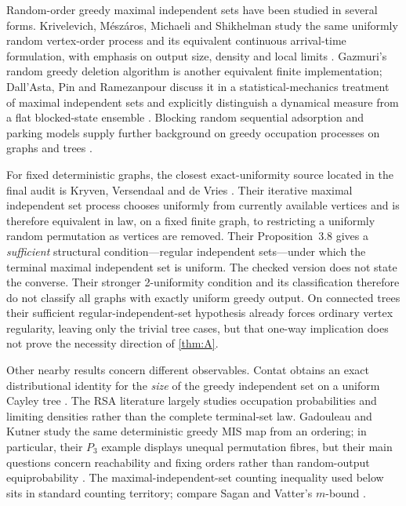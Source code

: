 \documentclass[11pt]{article}
\theoremstyle{definition}
\begin{document}
Random-order greedy maximal independent sets have been studied in several forms.  Krivelevich, M\'esz\'aros, Michaeli and Shikhelman study the same uniformly random vertex-order process and its equivalent continuous arrival-time formulation, with emphasis on output size, density and local limits \cite{KrivelevichEtAl2020}.  Gazmuri's random greedy deletion algorithm is another equivalent finite implementation; Dall'Asta, Pin and Ramezanpour discuss it in a statistical-mechanics treatment of maximal independent sets and explicitly distinguish a dynamical measure from a flat blocked-state ensemble \cite{Gazmuri1984,DallAstaEtAl2009}.  Blocking random sequential adsorption and parking models supply further background on greedy occupation processes on graphs and trees \cite{Pippenger1989,DehlingEtAl2008,Sudbury2009,PenroseSudbury2005}.

For fixed deterministic graphs, the closest exact-uniformity source located in the final audit is Kryven, Versendaal and de Vries \cite{KryvenEtAl2026}.  Their iterative maximal independent set process chooses uniformly from currently available vertices and is therefore equivalent in law, on a fixed finite graph, to restricting a uniformly random permutation as vertices are removed.  Their Proposition~3.8 gives a \emph{sufficient} structural condition---regular independent sets---under which the terminal maximal independent set is uniform.  The checked version does not state the converse.  Their stronger 2-uniformity condition and its classification therefore do not classify all graphs with exactly uniform greedy output.  On connected trees their sufficient regular-independent-set hypothesis already forces ordinary vertex regularity, leaving only the trivial tree cases, but that one-way implication does not prove the necessity direction of \cref{thm:A}.

Other nearby results concern different observables.  Contat obtains an exact distributional identity for the \emph{size} of the greedy independent set on a uniform Cayley tree \cite{Contat2021}.  The RSA literature largely studies occupation probabilities and limiting densities rather than the complete terminal-set law.  Gadouleau and Kutner study the same deterministic greedy MIS map from an ordering; in particular, their $P_3$ example displays unequal permutation fibres, but their main questions concern reachability and fixing orders rather than random-output equiprobability \cite{GadouleauKutner2025}.  The maximal-independent-set counting inequality used below sits in standard counting territory; compare Sagan and Vatter's $m$-bound \cite{SaganVatter2006}.
\end{document}
